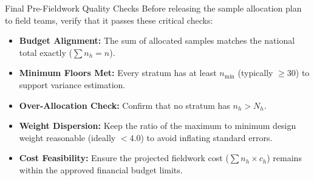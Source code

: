 \documentclass[10pt, aspectratio=169]{beamer}
\begin{document}
  \begin{frame}{Final Pre-Fieldwork Quality Checks}
      Before releasing the sample allocation plan to field teams, verify that it passes these critical checks:
      
      \vspace{0.3cm}
      \begin{itemize}
          \item[\(\square\)] \textbf{Budget Alignment:} The sum of allocated samples matches the national total exactly ($\sum n_h = n$).
          \item[\(\square\)] \textbf{Minimum Floors Met:} Every stratum has at least $n_{\min}$ (typically $\ge 30$) to support variance estimation.
          \item[\(\square\)] \textbf{Over-Allocation Check:} Confirm that no stratum has $n_h > N_h$.
          \item[\(\square\)] \textbf{Weight Dispersion:} Keep the ratio of the maximum to minimum design weight reasonable (ideally $< 4.0$) to avoid inflating standard errors.
          \item[\(\square\)] \textbf{Cost Feasibility:} Ensure the projected fieldwork cost ($\sum n_h \times c_h$) remains within the approved financial budget limits.
      \end{itemize}
  \end{frame}
  
  
\end{document}
